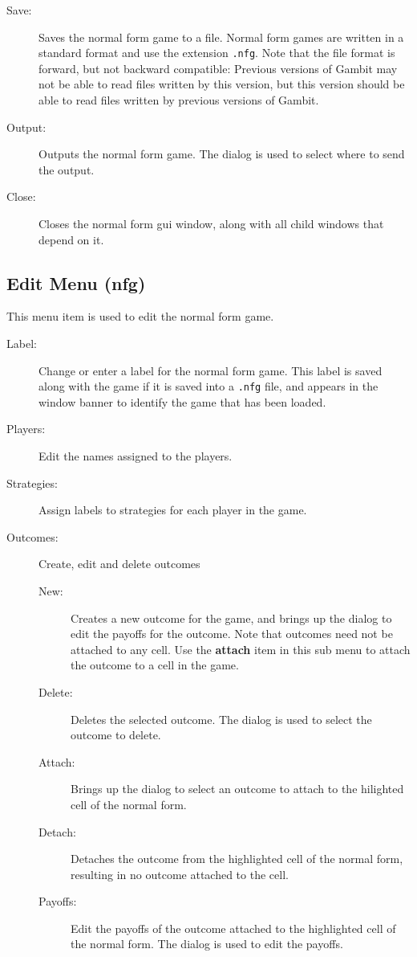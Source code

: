\begin{description}
\item[Save:] Saves the normal form game to a file.  Normal form games
are written in a standard format and use the extension {\tt .nfg}.
Note that the file format is forward, but not backward compatible:
Previous versions of Gambit may not be able to read files written by
this version, but this version should be able to read files written by
previous versions of Gambit.
\item[Output:] Outputs the normal form game.  The  dialog is used to select where to send the output. 
\item[Close:] Closes the normal form gui window, along with all child windows that depend on it.  
\end{description}

\subsection{Edit Menu (nfg)}\label{nfedit}

This menu item is used to edit the normal form game.  

\begin{description}
\item[Label:] Change or enter a label for the normal form game. This
label is saved along with the game if it is saved into a {\tt .nfg}
file, and appears in the window banner to identify the game that has
been loaded.
\item[Players:] Edit the names assigned to the players. 
\item[Strategies:] Assign labels to strategies for each player in the game.   
\item[Outcomes:] Create, edit and delete outcomes
\begin{description}
\item[New:] Creates a new outcome for the game, and brings up the 
 dialog to edit the payoffs for
the outcome.  Note that outcomes need not be attached to any cell.
Use the {\bf attach} item in this sub menu to attach the outcome to a
cell in the game. 
\item[Delete:] Deletes the selected outcome.  The  dialog is used to select the outcome to
delete.
\item[Attach:] Brings up the  
dialog to select an outcome to attach to the hilighted cell of the
normal form.
\item[Detach:] Detaches the outcome from the highlighted cell of the
normal form, resulting in no outcome attached to the cell. 
\item[Payoffs:] Edit the payoffs of the outcome attached to the
highlighted cell of the normal form. The  dialog is used to edit the payoffs.
\end{description}
\end{description}

